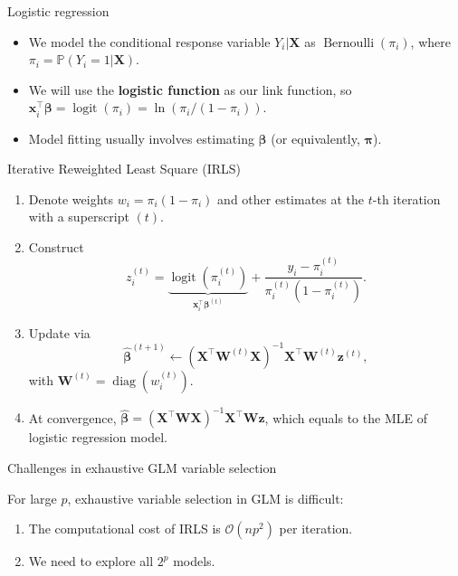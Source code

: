 \documentclass[12pt,aspectratio=169]{beamer}
\newcommand{\bx}{\boldsymbol{x}}
\newcommand{\bX}{\boldsymbol{X}}
\newcommand{\bW}{\boldsymbol{W}}
\newcommand{\bz}{\boldsymbol{z}}
\newcommand{\bbeta}{\boldsymbol{\beta}}
\newcommand{\bbetaHat}{\widehat{\boldsymbol{\beta}}}
\newcommand{\bPi}{\boldsymbol{\pi}}
\newcommand{\piit}{\pi_i^{(t)}}
\newcommand{\logit}{\operatorname{logit}}
\begin{document}
\begin{frame}{Logistic regression}
 \begin{itemize}
 	\item We model the conditional response variable $ Y_i | \bX$ as $ \operatorname{Bernoulli}(\pi_i) $, where $ \pi_i = \mathbb{P}(Y_i  = 1| \bX)$. 
 	\item We will use the \textbf{logistic function} as our link function, so $ \bx_i^\top \bbeta = \operatorname{logit}(\pi_i) = \ln \left( \pi_i/(1-\pi_i) \right)$.
 	\item Model fitting usually involves estimating $ \bbeta $ (or equivalently, $ \bPi $). 
 \end{itemize}
\end{frame}

\begin{frame}{Iterative Reweighted Least Square (IRLS)}
	\begin{enumerate}
	\item Denote weights $ w_i = \pi_i (1-\pi_i)$ and other estimates at the $ t $-th iteration with a superscript $ (t) $.
	\item Construct 
	\begin{equation*}
	z_i^{(t)} = \underbrace{\logit\left( \piit \right)}_{\bx_i^\top \bbeta^{(t)}}+ \frac{y_i-\piit}{\piit(1-\piit)}.
	\end{equation*}
	\item Update via
	\begin{equation*}
	\bbetaHat^{(t+1)} \leftarrow (\bX^\top \bW^{(t)} \bX)^{-1} \bX^\top \bW^{(t)} \bz^{(t)},
	\end{equation*}
	with $ \bW^{(t)} = \operatorname{diag}\left(w_i^{(t)}\right)$.
	
	\item At convergence, $ \bbetaHat = (\bX^\top \bW \bX)^{-1}\bX^\top \bW \bz$, which equals to the MLE of logistic regression model.
\end{enumerate}
\end{frame}




\begin{frame}{Challenges in exhaustive GLM variable selection}

For large $ p $, exhaustive variable selection in GLM is difficult:
	\begin{enumerate}

\item The computational cost of IRLS is $ \mathcal{O}(np^2) $ per iteration.

\item We need to explore all $ 2^p $ models.
\end{enumerate}



\end{frame}
\end{document}

